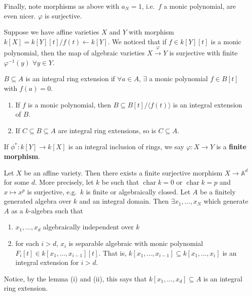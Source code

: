 \documentclass{article}
\newcommand{\A}{\mathbb{A}}
\DeclareMathOperator{\chara}{char}
\begin{document}
Finally, note morphisms as above with $a_N = 1$, i.e.\ $f$ a monic polynomial, are even nicer. $\varphi$ is surjective.

Suppose we have affine varieties $X$ and $Y$ with morphism $k[X] = k[Y][t]/f(t) \leftarrow k[Y]$.
We noticed that if $f \in k[Y][t]$ is a monic polynomial, then the map of algebraic varieties $X \xrightarrow{\varphi} Y$ is surjective with finite $\varphi^{-1}(y)$ $\forall y \in Y$.

\begin{defi}
    $B \subseteq A$ is an integral ring extension if $\forall a \in A$, $\exists$ a monic polynomial $f \in B[t]$ with $f(a) = 0$.
\end{defi}
\begin{lemma}
    \begin{enumerate}[label=(\roman*)]
        \item If $f$ is a monic polynomial, then $B \subseteq B[t]/\langle f(t) \rangle$ is an integral extension of $B$.
        \item If $C \subseteq B \subseteq A$ are integral ring extensions, so is $C \subseteq A$.
    \end{enumerate}
\end{lemma}
\begin{defi}
    If $\phi^*: k[Y] \to k[X]$ is an integral inclusion of rings, we say $\varphi: X \to Y$ is a \textbf{finite morphism}.
\end{defi}
\begin{thm}
    Let $X$ be an affine variety. Then there exists a finite surjective morphism $X \to \A^d$ for some $d$.
    More precisely, let $k$ be such that $\chara k = 0$ or $\chara k = p$ and $x \mapsto x^p$ is surjective, e.g.\ $k$ is finite or algebraically closed.
    Let $A$ be a finitely generated algebra over $k$ and an integral domain. Then $\exists x_1, \dotsc, x_N$ which generate $A$ as a $k$-algebra such that
    \begin{enumerate}[label=(\roman*)]
        \item $x_1, \dotsc, x_d$ algebraically independent over $k$
        \item for each $i > d$, $x_i$ is separable algebraic with monic polynomial $F_i[t] \in k[x_1, \dotsc, x_{i-1}][t]$. That is, $k[x_1, \dotsc, x_{i-1}] \subseteq k[x_1, \dotsc, x_i]$ is an integral extension for $i > d$.
    \end{enumerate}
\end{thm}
Notice, by the lemma (i) and (ii), this says that $k[x_1, \dotsc, x_d] \subseteq A$ is an integral ring extension.
\end{document}
